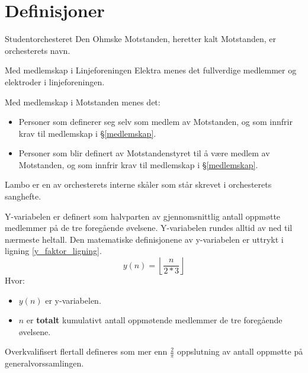 \section{Definisjoner}

\begin{definition}
    Studentorchesteret Den Ohmske Motstanden, heretter kalt Motstanden, er orchesterets navn.
\end{definition}

\begin{definition}
    Med medlemskap i Linjeforeningen Elektra menes det fullverdige medlemmer og elektroder i linjeforeningen.
\end{definition}

\begin{definition}
    Med medlemskap i Motstanden menes det: 
    \begin{itemize}
        \item Personer som definerer seg selv som medlem av Motstanden, og som innfrir krav til medlemskap i
        \S\hspace{3pt}\ref{medlemskap}.
        \item Personer som blir definert av Motstandenstyret til å være medlem av Motstanden, og som innfrir krav til medlemskap i \S\hspace{3pt}\ref{medlemskap}.
    \end{itemize}
\end{definition}

\begin{definition}
    Lambo er en av orchesterets interne skåler som står skrevet i orchesterets sanghefte.
\end{definition}

\begin{definition}[\label{y_faktor_paragraf}]
    Y-variabelen er definert som halvparten av gjennomsnittlig antall oppmøtte medlemmer på de tre foregående øvelsene. Y-variabelen rundes alltid av ned til nærmeste heltall. Den matematiske definisjonene av y-variabelen er uttrykt i ligning \ref{y_faktor_ligning}.
    \begin{equation}\label{y_faktor_ligning}
        y(n) = \left\lfloor \frac{n}{2*3} \right\rfloor
    \end{equation}
    Hvor:
    \begin{itemize}
        \item $y(n)$ er y-variabelen.
        \item $n$ er \textbf{totalt} kumulativt antall oppmøtende medlemmer de tre foregående øvelsene. 
    \end{itemize}
\end{definition}

\begin{definition}[\label{overkvalifisert_flertall}]
    Overkvalifisert flertall defineres som mer enn $\frac{2}{\pi}$ oppslutning av antall oppmøtte på generalvorssamlingen.
\end{definition}